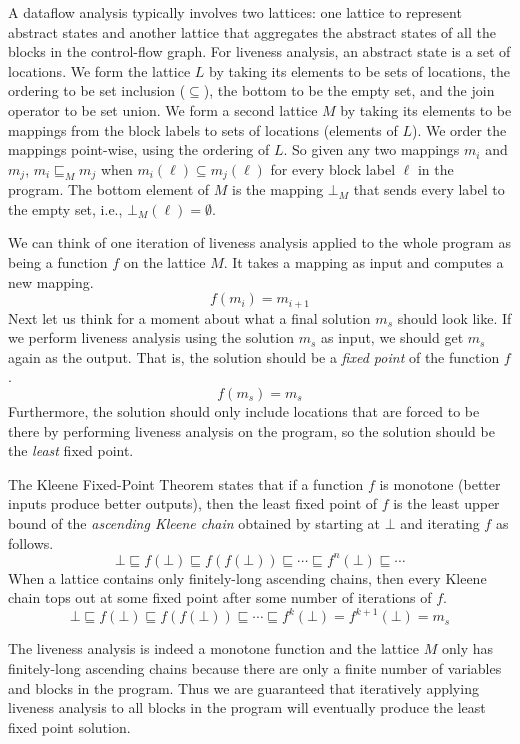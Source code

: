 \documentclass[7x10,nocrop]{TimesAPriori_MIT}%
\begin{document}
A dataflow analysis typically involves two lattices: one lattice to
represent abstract states and another lattice that aggregates the
abstract states of all the blocks in the control-flow graph.  For
liveness analysis, an abstract state is a set of locations.  We form
the lattice $L$ by taking its elements to be sets of locations, the
ordering to be set inclusion ($\subseteq$), the bottom to be the empty
set, and the join operator to be set union.
%
We form a second lattice $M$ by taking its elements to be mappings
from the block labels to sets of locations (elements of $L$).  We
order the mappings point-wise, using the ordering of $L$. So given any
two mappings $m_i$ and $m_j$, $m_i \sqsubseteq_M m_j$ when $m_i(\ell)
\subseteq m_j(\ell)$ for every block label $\ell$ in the program.  The
bottom element of $M$ is the mapping $\bot_M$ that sends every label
to the empty set, i.e., $\bot_M(\ell) = \emptyset$.

We can think of one iteration of liveness analysis applied to the
whole program as being a function $f$ on the lattice $M$. It takes a
mapping as input and computes a new mapping.
\[
   f(m_i) = m_{i+1}
\]
Next let us think for a moment about what a final solution $m_s$
should look like. If we perform liveness analysis using the solution
$m_s$ as input, we should get $m_s$ again as the output. That is, the
solution should be a \emph{fixed point} of the function $f$.
\[
   f(m_s) = m_s
\]
Furthermore, the solution should only include locations that are
forced to be there by performing liveness analysis on the program, so
the solution should be the \emph{least} fixed point.

The Kleene Fixed-Point Theorem states that if a function $f$ is
monotone (better inputs produce better outputs), then the least fixed
point of $f$ is the least upper bound of the \emph{ascending Kleene
  chain} obtained by starting at $\bot$ and iterating $f$ as
follows.
\[
\bot \sqsubseteq f(\bot) \sqsubseteq f(f(\bot)) \sqsubseteq \cdots
  \sqsubseteq f^n(\bot) \sqsubseteq \cdots
\]
When a lattice contains only finitely-long ascending chains, then
every Kleene chain tops out at some fixed point after some number of
iterations of $f$.
\[
\bot \sqsubseteq f(\bot) \sqsubseteq f(f(\bot)) \sqsubseteq \cdots
\sqsubseteq f^k(\bot) = f^{k+1}(\bot) = m_s
\]

The liveness analysis is indeed a monotone function and the lattice
$M$ only has finitely-long ascending chains because there are only a
finite number of variables and blocks in the program. Thus we are
guaranteed that iteratively applying liveness analysis to all blocks
in the program will eventually produce the least fixed point solution.
\end{document}
